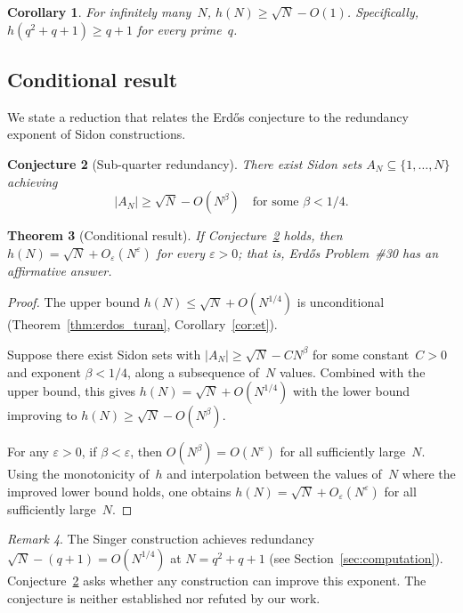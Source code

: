 \documentclass[11pt]{amsart}
\theoremstyle{plain}
\newtheorem{theorem}{Theorem}[section]
\newtheorem{corollary}[theorem]{Corollary}
\newtheorem{conjecture}[theorem]{Conjecture}
\theoremstyle{definition}
\theoremstyle{remark}
\newtheorem{remark}[theorem]{Remark}
\begin{document}
\begin{corollary}\label{cor:singer_lb}
For infinitely many~$N$, $h(N) \ge \sqrt{N} - O(1)$.
Specifically, $h(q^2 + q + 1) \ge q + 1$ for every prime~$q$.
\end{corollary}

\subsection{Conditional result}

We state a reduction that relates the Erd\H{o}s conjecture to the
redundancy exponent of Sidon constructions.

\begin{conjecture}[Sub-quarter redundancy]\label{conj:sub_quarter}
There exist Sidon sets $A_N \subseteq \{1,\dots,N\}$ achieving
\[
  |A_N| \ge \sqrt{N} - O(N^\beta) \quad
  \text{for some } \beta < 1/4.
\]
\end{conjecture}

\begin{theorem}[Conditional result]\label{thm:conditional}
If Conjecture~\ref{conj:sub_quarter} holds, then
$h(N) = \sqrt{N} + O_\varepsilon(N^\varepsilon)$ for every
$\varepsilon > 0$; that is, Erd\H{o}s Problem~\#30 has an
affirmative answer.
\end{theorem}

\begin{proof}
The upper bound $h(N) \le \sqrt{N} + O(N^{1/4})$ is unconditional
(Theorem~\ref{thm:erdos_turan}, Corollary~\ref{cor:et}).

Suppose there exist Sidon sets with
$|A_N| \ge \sqrt{N} - C N^\beta$ for some constant~$C > 0$ and
exponent $\beta < 1/4$, along a subsequence of~$N$ values.
Combined with the upper bound, this gives
$h(N) = \sqrt{N} + O(N^{1/4})$ with the lower bound improving to
$h(N) \ge \sqrt{N} - O(N^\beta)$.

For any $\varepsilon > 0$, if $\beta < \varepsilon$, then
$O(N^\beta) = O(N^\varepsilon)$ for all sufficiently large~$N$.
Using the monotonicity of~$h$ and interpolation between the values
of~$N$ where the improved lower bound holds, one obtains
$h(N) = \sqrt{N} + O_\varepsilon(N^\varepsilon)$ for all
sufficiently large~$N$.
\end{proof}

\begin{remark}
The Singer construction achieves redundancy
$\sqrt{N} - (q+1) = O(N^{1/4})$ at $N = q^2+q+1$
(see Section~\ref{sec:computation}).
Conjecture~\ref{conj:sub_quarter} asks whether any construction
can improve this exponent.
The conjecture is neither established nor refuted by our work.
\end{remark}
\end{document}
